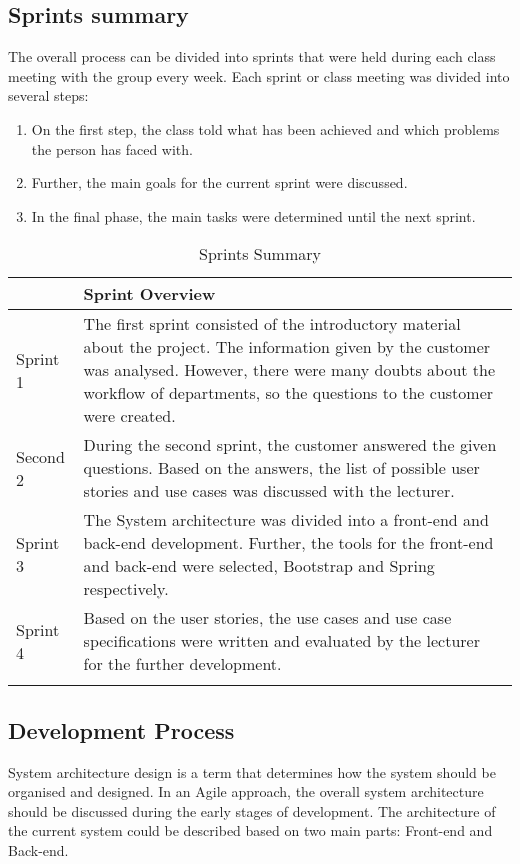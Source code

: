 \documentclass[a4paper]{article}
\begin{document}
 
    
    \newpage
    
    \subsection{Sprints summary}
    
    The overall process can be divided into sprints that were held during each class meeting with the group every week. Each sprint or class meeting was divided into several steps: 
    \begin{enumerate}
        \item On the first step, the class told what has been achieved and which problems the person has faced with. 
        \item Further, the main goals for the current sprint were discussed. 
        \item In the final phase, the main tasks were determined until the next sprint.
    \end{enumerate}

    \begin{longtable}{|p{}|p{}|}
        \hline
         & Sprint Overview \\
         \hline
        Sprint 1 & The first sprint consisted of the introductory material about the project. The information given by the customer was analysed. However, there were many doubts about the workflow of departments, so the questions to the customer were created. \\
         \hline
        Second 2 & During the second sprint, the customer answered the given questions. Based on the answers, the list of possible user stories and use cases was discussed with the lecturer.  \\
        \hline
        Sprint 3 & The System architecture was divided into a front-end and back-end development. Further, the tools for the front-end and back-end were selected, Bootstrap and Spring respectively. \\
        \hline
        Sprint 4 & Based on the user stories, the use cases and use case specifications were written and evaluated by the lecturer for the further development.\\
        \hline
        \caption{Sprints Summary}
        \label{SprintsSummary}
    \end{longtable}
    
    \subsection{Development Process}
    System architecture design is a term that determines how the system should be organised and designed. In an Agile approach, the overall system architecture should be discussed during the early stages of development. 
    The architecture of the current system could be described based on two main parts: Front-end and Back-end.
    
\end{document}
